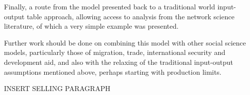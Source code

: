 \documentclass[a4paper]{article}
\begin{document}
Finally, a route from the model presented back to a traditional world input-output table approach, allowing access to analysis from the network science literature, of which a very simple example was presented.

Further work should be done on combining this model with other social science models, particularly those of migration, trade, international security and development aid, and also with the relaxing of the traditional input-output assumptions mentioned above, perhaps starting with production limits.

INSERT SELLING PARAGRAPH

\printbibliography
\end{document}
